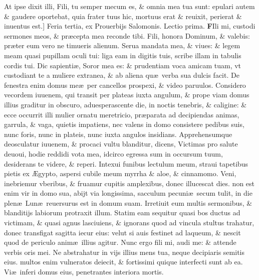 \documentclass[a5paper,10pt]{book}
\def\rightmarginnote{%
	\lrmarginnote{\hskip\columnwidth \hskip -1em}}
\def\ae{æ}
\def\AE{Æ}
\begin{document}
\begin{multicols*}{2}
At ipse dixit illi, Fili, tu semper mecum es, \& omnia mea tua sunt: epulari autem \& gaudere oportebat, quia frater tuus hic, mortuus erat \& reuixit, perierat \& inuentus est.]
\newline {} \color{red} \hypertarget{TUE-SECVNDA-POST-ADV}{Feria tertia,} ex Prouerbijs Salomonis. \hfill Lectio prima. \color{black}
\vspace{-.25em}
\lettrine[lines=2]{\bfseries F}{}Ili\rightmarginnote{ca. 7.} mi, custodi sermones meos, \& pr\ae cepta mea reconde tibi.
Fili, honora Dominum, \& valebis: pr\ae ter eum vero ne timueris alienum. %
Serua mandata mea, \& viues: \& legem meam quasi pupillam oculi tui: liga eam in digitis tuis, scribe illam in tabulis cordis tui.
Dic sapienti\ae , Soror mea es: \& prudentiam voca amicam tuam, vt custodiant te a muliere extranea, \& ab aliena qu\ae \ verba sua dulcis facit.
De fenestra enim domus me\ae \ per cancellos prospexi, \& video paruulos. Considero vecordem iuuenem, qui transit per plateas iuxta angulum, \& prope viam domus illius graditur in obscuro, aduesperascente die, in noctis tenebris, \& caligine: \& ecce occurrit illi mulier ornatu meretricio, pr\ae parata ad decipiendas animas, garrula, \& vaga, quietis impatiens, nec valens in domo consistere pedibus suis, nunc foris, nunc in plateis, nunc iuxta angulos insidians.
Apprehensumque deosculatur iuuenem, \& procaci vultu blanditur, dicens, Victimas pro salute deuoui, hodie reddidi vota mea, idcirco egressa sum in occursum
tuum, desiderans te videre, \& reperi.
Intexui funibus lectulum meum, straui tapetibus pietis ex \AE gypto, aspersi cubile meum myrrha \& aloe, \& cinnamomo.
Veni, inebriemur vberibus, \& fruamur cupitis amplexibus, donec illucescat dies. non est enim vir in domo sua, abijt via longissima, sacculum pecuni\ae \ secum tulit, in die plen\ae \ Lun\ae \ reuersurus est in domum suam.
Irretiuit eum multis sermonibus, \& blanditijs labiorum protraxit illum.
Statim eam sequitur quasi bos ductus ad victimam, \& quasi agnus lasciuiens, \& ignorans quod ad vincula stultus trahatur, donec transfigat sagitta iecur eius: velut si auis festinet ad laqueum, \& nescit quod de periculo anim\ae \ illius agitur.
Nunc ergo fili mi, audi me: \& attende verbis oris mei. Ne abstrahatur in vijs illius mens tua, neque decipiaris semitis eius. multos enim vulneratos deiecit, \& fortissimi quique interfecti sunt ab ea.
Vi\ae \ inferi domus eius, penetrantes interiora mortis.
\fancyhead[C]{\color{red} Feria. iij. Dominic\ae . ij. post aduentum}

\end{multicols*}
\end{document}
